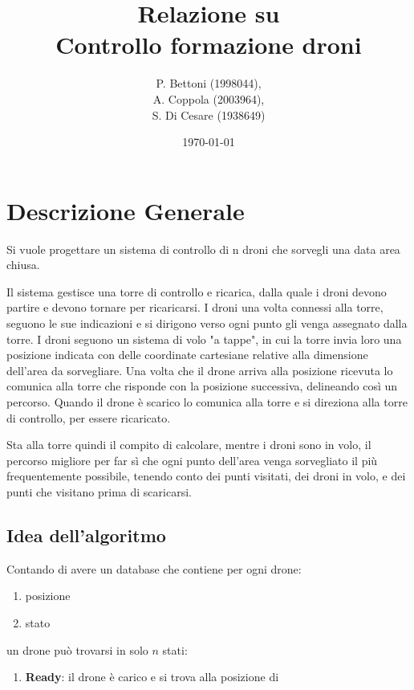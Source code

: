 \documentclass[a4paper, 12pt]{report}
\title{Relazione su \\
Controllo formazione droni}
\author{P. Bettoni (1998044),\\ A. Coppola (2003964),\\S. Di Cesare (1938649)}
\date{\today}
\begin{document}
\maketitle
\newpage
\tableofcontents
\newpage
\chapter*{Descrizione Generale}
Si vuole progettare un sistema di controllo di n droni che sorvegli una data area chiusa.

Il sistema gestisce una torre di controllo e ricarica, dalla quale i droni devono partire e devono tornare per ricaricarsi. 
I droni una volta connessi alla torre, seguono le sue indicazioni e si dirigono verso ogni punto gli venga assegnato dalla torre.
I droni seguono un sistema di volo "a tappe", in cui la torre invia loro una posizione indicata con delle coordinate cartesiane
relative alla dimensione dell'area da sorvegliare. Una volta che il drone arriva alla posizione ricevuta lo comunica alla torre che risponde con la posizione successiva, delineando così un percorso.
Quando il drone è scarico lo comunica alla torre e si direziona alla torre di controllo, per essere ricaricato.

Sta alla torre quindi il compito di calcolare, mentre i droni sono in volo, il percorso migliore per far sì che ogni punto dell'area venga sorvegliato 
il più frequentemente possibile, tenendo conto dei punti visitati, dei droni in volo, e dei punti che visitano prima di scaricarsi.

\section*{Idea dell'algoritmo}
Contando di avere un database che contiene per ogni drone:
\begin{enumerate}
    \item posizione
    \item stato
\end{enumerate}

un drone può trovarsi in solo $n$ stati:
\begin{enumerate}
    \item \textbf{Ready}: il drone è carico e si trova alla posizione di 
\end{enumerate}
\end{document}
